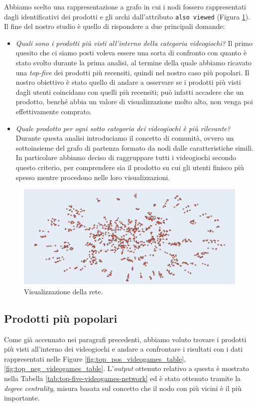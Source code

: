 		Abbiamo scelto una rappresentazione a grafo in cui i nodi fossero rappresentati dagli identificativi dei prodotti e gli archi dall'attributo \verb|also viewed| (Figura \ref{fig:network}).  Il fine del nostro studio è quello di rispondere a due principali domande: 
		\begin{itemize}
			\item \textit{Quali sono i prodotti più visti all'interno della categoria videogiochi?}
			Il primo quesito che ci siamo posti voleva essere una sorta di confronto con quanto è stato svolto durante la prima analisi, al termine della quale abbiamo ricavato una \textit{top-five} dei prodotti più recensiti, quindi nel nostro caso più popolari. Il nostro obiettivo è stato quello di andare a osservare se i prodotti più visti dagli utenti coincidano con quelli più recensiti; può infatti accadere che un prodotto, benché abbia un valore di visualizzazione molto alto, non venga poi effettivamente comprato.
			
			\item \textit{Quale prodotto per ogni sotto categoria dei videogiochi è più rilevante?}
			Durante questa analisi introduciamo il concetto di comunità, ovvero un sottoinsieme del grafo di partenza formato da nodi dalle caratteristiche simili. In particolare abbiamo deciso di raggruppare tutti i videogiochi secondo questo criterio, per comprendere sia il prodotto su cui gli utenti finisco più spesso mentre procedono nelle loro visualizzazioni.
		\end{itemize}
	
		\begin{figure} 
			\includegraphics[width=\textwidth]{Figure/network}
			\caption{Visualizzazione della rete.}
			\label{fig:network}
		\end{figure}
		
		\subsection{Prodotti più popolari}
			Come già accennato nei paragrafi precedenti, abbiamo voluto trovare i prodotti più visti all'interno dei videogiochi e andare a confrontare i risultati con i dati rappresentati nelle Figure \ref{fig:top_pos_videogames_table}, \ref{fig:top_neg_videogames_table}. L'\textit{output} ottenuto relativo a questa è mostrato nella Tabella \ref{tab:top-five-videogames-network} ed è stato ottenuto tramite la \textit{degree centrality}, misura basata sul concetto che il nodo con più vicini è il più importante.
			
